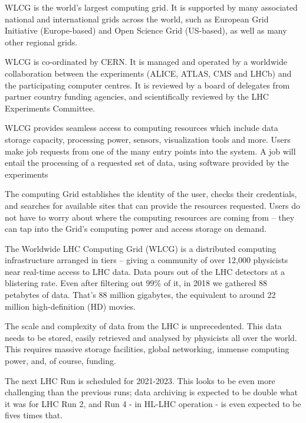 WLCG is the world's largest computing grid. It is supported by many associated national and international grids across the world, such as European Grid Initiative (Europe-based) and Open Science Grid (US-based), as well as many other regional grids.

WLCG is co-ordinated by CERN. It is managed and operated by a worldwide collaboration between the experiments (ALICE, ATLAS, CMS and LHCb) and the participating computer centres. It is reviewed by a board of delegates from partner country funding agencies, and scientifically reviewed by the LHC Experiments Committee.

WLCG provides seamless access to computing resources which include data storage capacity, processing power, sensors, visualization tools and more. Users make job requests from one of the many entry points into the system. A job will entail the processing of a requested set of data, using software provided by the experiments

The computing Grid establishes the identity of the user, checks their credentials, and searches for available sites that can provide the resources requested. Users do not have to worry about where the computing resources are coming from – they can tap into the Grid's computing power and access storage on demand.


The Worldwide LHC Computing Grid (WLCG) is a distributed computing infrastructure arranged in tiers – giving a community of over 12,000 physicists near real-time access to LHC data. Data pours out of the LHC detectors at a blistering rate. Even after filtering out 99\% of it, in 2018 we gathered 88 petabytes of data. That's 88 million gigabytes, the equivalent to around 22 million high-definition (HD) movies.

The scale and complexity of data from the LHC is unprecedented. This data needs to be stored, easily retrieved and analysed by physicists all over the world. This requires massive storage facilities, global networking, immense computing power, and, of course, funding.


The next LHC Run is scheduled for 2021-2023. This looks to be even more challenging than the previous runs; data archiving is expected to be double what it was for LHC Run 2, and Run 4 - in HL-LHC operation - is even expected to be fives times that. 

